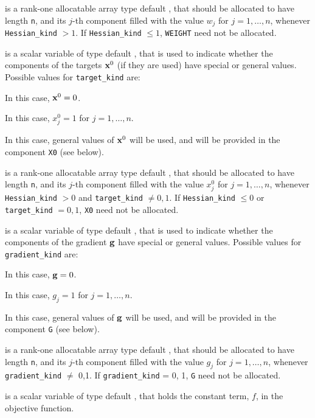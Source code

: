 \documentclass{galahad}
\begin{document}
\begin{description}
 is a rank-one allocatable array type default \realdp, that
should be allocated to have length {\tt n}, and its $j$-th component
filled with the value $w_{j}$ for $j = 1, \ldots , n$,
whenever {\tt Hessian\_kind} $>1$.
If {\tt Hessian\_kind} $\leq 1$, {\tt WEIGHT} need not be allocated.

 is a scalar variable of type default \integer,
that is used to indicate whether the components of the targets ${\mathbf{x}}^0$
(if they are used) have special or general values. Possible values for
{\tt target\_kind} are:
\begin{description}
  In this case, ${\mathbf{x}}^0 = 0$.

 In this case, $x^0_{j} = 1$ for $j = 1, \ldots , n$.

 In this case, general values of ${\mathbf{x}}^0$ will be used,
     and will be provided in the component {\tt X0} (see below).
\end{description}

 is a rank-one allocatable array type default \realdp, that
should be allocated to have length {\tt n}, and its $j$-th component
filled with the value $x_{j}^0$ for $j = 1, \ldots , n$,
whenever {\tt Hessian\_kind} $>0$ and {\tt target\_kind} $\neq 0,1$.
If {\tt Hessian\_kind} $\leq 0$ or {\tt target\_kind} $= 0,1$,
{\tt X0} need not be allocated.

 is a scalar variable of type default \integer,
that is used to indicate whether the components of the gradient ${\mathbf{g}}$
have special or general values. Possible values for {\tt gradient\_kind} are:
\begin{description}
  In this case, ${\mathbf{g}} = 0$.

 In this case, $g_{j} = 1$ for $j = 1, \ldots , n$.

 In this case, general values of ${\mathbf{g}}$ will be used,
     and will be provided in the component {\tt G} (see below).
\end{description}

 is a rank-one allocatable array type default \realdp, that
should be allocated to have length {\tt n}, and its $j$-th component
filled with the value $g_{j}$ for $j = 1, \ldots , n$,
whenever {\tt gradient\_kind} $\neq$ 0,1.
If {\tt gradient\_kind} {= 0, 1}, {\tt G} need not be allocated.

 is a scalar variable of type
default \realdp, that holds
the constant term, $f$, in the objective function.


\end{description}
\end{document}
